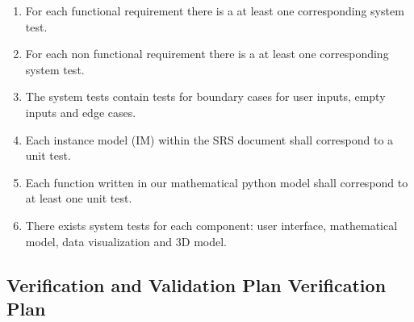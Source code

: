 \documentclass[12pt, titlepage]{article}
\begin{document}
\begin{enumerate}
  \item For each functional requirement there is a at least one corresponding system test.
  \item For each non functional requirement there is a at least one corresponding system test.  
  \item The system tests contain tests for boundary cases for user inputs, empty inputs and edge cases. 
  \item Each instance model (IM) within the SRS document shall correspond to a unit test. 
  \item Each function written in our mathematical python model shall correspond to at least one unit test. 
  \item There exists system tests for each component: user interface, mathematical model, data visualization and 3D model. 
\end{enumerate}
\subsection{Verification and Validation Plan Verification Plan}



\end{document}
